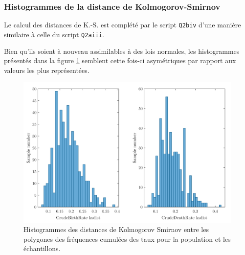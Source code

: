 \documentclass[a4paper, 12pt]{article}
\begin{document}
	\subsubsection{Histogrammes de la distance de Kolmogorov-Smirnov} \label{sec:Q2biv}
	Le calcul des distances de K.-S. est complété par le script \texttt{Q2biv} d'une manière similaire à celle du script \texttt{Q2aiii}. \par
	Bien qu'ils soient à nouveau assimilables à des lois normales, les histogrammes présentés dans la figure \ref{figure:Q2biv} semblent cette fois-ci asymétriques par rapport aux valeurs les plus représentées. \par
	\begin{figure}[h!]
		\centering
		\includegraphics[scale=0.24]{resources/pdf/q2biv.pdf}
		\caption{Histogrammes des distances de Kolmogorov Smirnov entre les polygones des fréquences cumulées des taux pour la population et les échantillons.}
		\label{figure:Q2biv}
	\end{figure}
\end{document}
